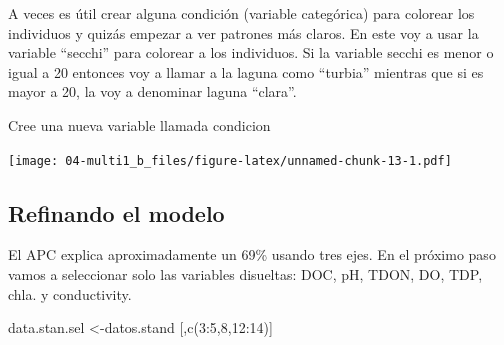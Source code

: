 \documentclass[
]{book}
\newenvironment{Shaded}{\begin{snugshade}}{\end{snugshade}}
\newcommand{\AttributeTok}[1]{\textcolor[rgb]{0.77,0.63,0.00}{#1}}
\newcommand{\ConstantTok}[1]{\textcolor[rgb]{0.00,0.00,0.00}{#1}}
\newcommand{\DecValTok}[1]{\textcolor[rgb]{0.00,0.00,0.81}{#1}}
\newcommand{\FunctionTok}[1]{\textcolor[rgb]{0.00,0.00,0.00}{#1}}
\newcommand{\NormalTok}[1]{#1}
\newcommand{\OtherTok}[1]{\textcolor[rgb]{0.56,0.35,0.01}{#1}}
\newcommand{\SpecialCharTok}[1]{\textcolor[rgb]{0.00,0.00,0.00}{#1}}
\newcommand{\StringTok}[1]{\textcolor[rgb]{0.31,0.60,0.02}{#1}}
\begin{document}
A veces es útil crear alguna condición (variable categórica) para colorear los individuos y quizás empezar a ver patrones más claros. En este voy a usar la variable ``secchi'' para colorear a los individuos. Si la variable secchi es menor o igual a 20 entonces voy a llamar a la laguna como ``turbia'' mientras que si es mayor a 20, la voy a denominar laguna ``clara''.

\begin{Shaded}
\end{Shaded}

Cree una nueva variable llamada condicion

\begin{Shaded}
\end{Shaded}

\texttt{[image: 04-multi1\_b\_files/figure-latex/unnamed-chunk-13-1.pdf]}

\hypertarget{refinando-el-modelo}{%
\subsection{Refinando el modelo}\label{refinando-el-modelo}}

El APC explica aproximadamente un 69\% usando tres ejes. En el próximo paso vamos a seleccionar solo las variables disueltas: DOC, pH, TDON, DO, TDP, chla. y conductivity.

\begin{Shaded}
\begin{Highlighting}[]
\NormalTok{data.stan.sel }\OtherTok{\textless{}{-}}\NormalTok{datos.stand [,}\FunctionTok{c}\NormalTok{(}\DecValTok{3}\SpecialCharTok{:}\DecValTok{5}\NormalTok{,}\DecValTok{8}\NormalTok{,}\DecValTok{12}\SpecialCharTok{:}\DecValTok{14}\NormalTok{)]}
\end{Highlighting}
\end{Shaded}
\end{document}

